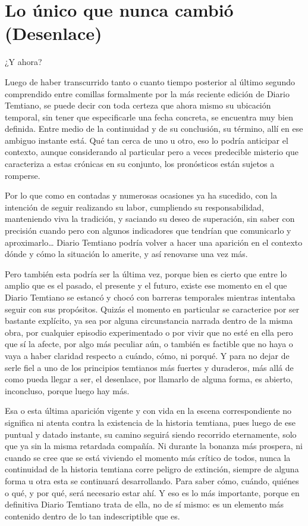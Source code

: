 \documentclass[
  spanish,
]{book}
\begin{document}
\hypertarget{lo-uxfanico-que-nunca-cambiuxf3-desenlace}{%
\chapter{Lo único que nunca cambió (Desenlace)}\label{lo-uxfanico-que-nunca-cambiuxf3-desenlace}}

¿Y ahora?

Luego de haber transcurrido tanto o cuanto tiempo posterior al último segundo comprendido entre comillas formalmente por la más reciente edición de Diario Temtiano, se puede decir con toda certeza que ahora mismo su ubicación temporal, sin tener que especificarle una fecha concreta, se encuentra muy bien definida. Entre medio de la continuidad y de su conclusión, su término, allí en ese ambiguo instante está. Qué tan cerca de uno u otro, eso lo podría anticipar el contexto, aunque considerando al particular pero a veces predecible misterio que caracteriza a estas crónicas en su conjunto, los pronósticos están sujetos a romperse.

Por lo que como en contadas y numerosas ocasiones ya ha sucedido, con la intención de seguir realizando su labor, cumpliendo su responsabilidad, manteniendo viva la tradición, y saciando su deseo de superación, sin saber con precisión cuando pero con algunos indicadores que tendrían que comunicarlo y aproximarlo\ldots{} Diario Temtiano podría volver a hacer una aparición en el contexto dónde y cómo la situación lo amerite, y así renovarse una vez más.

Pero también esta podría ser la última vez, porque bien es cierto que entre lo amplio que es el pasado, el presente y el futuro, existe ese momento en el que Diario Temtiano se estancó y chocó con barreras temporales mientras intentaba seguir con sus propósitos. Quizás el momento en particular se caracterice por ser bastante explícito, ya sea por alguna circunstancia narrada dentro de la misma obra, por cualquier episodio experimentado o por vivir que no esté en ella pero que sí la afecte, por algo más peculiar aún, o también es factible que no haya o vaya a haber claridad respecto a cuándo, cómo, ni porqué. Y para no dejar de serle fiel a uno de los principios temtianos más fuertes y duraderos, más allá de como pueda llegar a ser, el desenlace, por llamarlo de alguna forma, es abierto, inconcluso, porque luego hay más.

Esa o esta última aparición vigente y con vida en la escena correspondiente no significa ni atenta contra la existencia de la historia temtiana, pues luego de ese puntual y datado instante, su camino seguirá siendo recorrido eternamente, solo que ya sin la misma retardada compañía. Ni durante la bonanza más prospera, ni cuando se cree que se está viviendo el momento más crítico de todos, nunca la continuidad de la historia temtiana corre peligro de extinción, siempre de alguna forma u otra esta se continuará desarrollando. Para saber cómo, cuándo, quiénes o qué, y por qué, será necesario estar ahí. Y eso es lo más importante, porque en definitiva Diario Temtiano trata de ella, no de sí mismo: es un elemento más contenido dentro de lo tan indescriptible que es.
\end{document}
